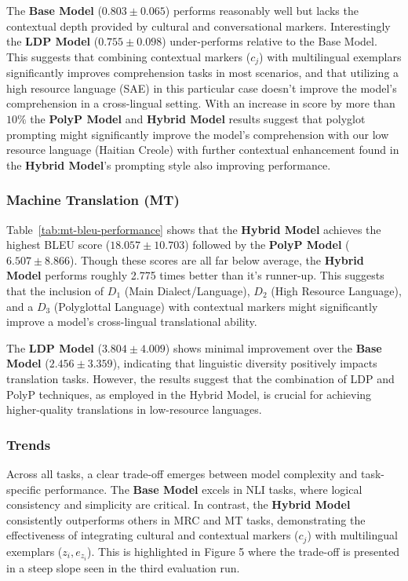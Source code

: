 The \textbf{Base Model} (\(0.803 \pm 0.065\)) performs reasonably well but lacks the contextual depth provided by cultural and conversational markers. Interestingly the \textbf{LDP Model} (\(0.755 \pm 0.098\)) under-performs relative to the Base Model. This suggests that combining contextual markers (\(c_j\)) with multilingual exemplars significantly improves comprehension tasks in most scenarios, and that utilizing a high resource language (SAE) in this particular case doesn't improve the model's comprehension in a cross-lingual setting. With an increase in score by more than $10\%$ the \textbf{PolyP Model} and \textbf{Hybrid Model} results suggest that polyglot prompting might significantly improve the model's comprehension with our low resource language (Haitian Creole) with further contextual enhancement found in the \textbf{Hybrid Model}'s prompting style also improving performance. 

\subsubsection{Machine Translation (MT)}

Table~\ref{tab:mt-bleu-performance} shows that the \textbf{Hybrid Model} achieves the highest BLEU score (\(18.057 \pm 10.703\)) followed by the \textbf{PolyP Model} (\(6.507 \pm 8.866\)). Though these scores are all far below average, the \textbf{Hybrid Model} performs roughly 2.775 times better than it's runner-up. This suggests that the inclusion of $D_1$ (Main Dialect/Language), $D_2$ (High Resource Language), and a $D_3$ (Polyglottal Language) with contextual markers might significantly improve a model's cross-lingual translational ability.

The \textbf{LDP Model} (\(3.804 \pm 4.009\)) shows minimal improvement over the \textbf{Base Model} (\(2.456 \pm 3.359\)), indicating that linguistic diversity positively impacts translation tasks. However, the results suggest that the combination of LDP and PolyP techniques, as employed in the Hybrid Model, is crucial for achieving higher-quality translations in low-resource languages.

\subsubsection{Trends}

Across all tasks, a clear trade-off emerges between model complexity and task-specific performance. The \textbf{Base Model} excels in NLI tasks, where logical consistency and simplicity are critical. In contrast, the \textbf{Hybrid Model} consistently outperforms others in MRC and MT tasks, demonstrating the effectiveness of integrating cultural and contextual markers (\(c_j\)) with multilingual exemplars (\(z_i, e_{z_i}\)). This is highlighted in Figure 5 where the trade-off is presented in a steep slope seen in the third evaluation run.

